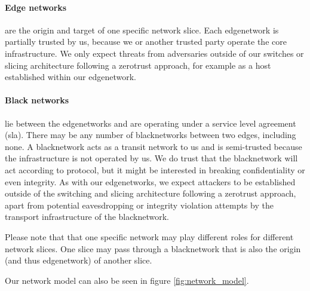 \paragraph{Edge networks}
are the origin and target of one specific network slice. Each \gls{edgenetwork} is partially trusted by us, because we or another trusted party operate the core infrastructure. We only expect threats from adversaries outside of our switches or slicing architecture following a \gls{zerotrust} approach, for example as a host established within our \gls{edgenetwork}.

\paragraph{Black networks}
lie between the \gls{edgenetwork}s and are operating under a service level agreement (\acrshort{sla}). There may be any number of \gls{blacknetwork}s between two edges, including none. A \gls{blacknetwork} acts as a transit network to us and is semi-trusted because the infrastructure is not operated by us. We do trust that the \gls{blacknetwork} will act according to protocol, but it might be interested in breaking confidentiality or even integrity. As with our \gls{edgenetwork}s, we expect attackers to be established outside of the switching and slicing architecture following a \gls{zerotrust} approach, apart from potential eavesdropping or integrity violation attempts by the transport infrastructure of the \gls{blacknetwork}.

Please note that that one specific network may play different roles for different network slices. One slice may pass through a \gls{blacknetwork} that is also the origin (and thus \gls{edgenetwork}) of another slice.

Our network model can also be seen in figure \ref{fig:network_model}.


